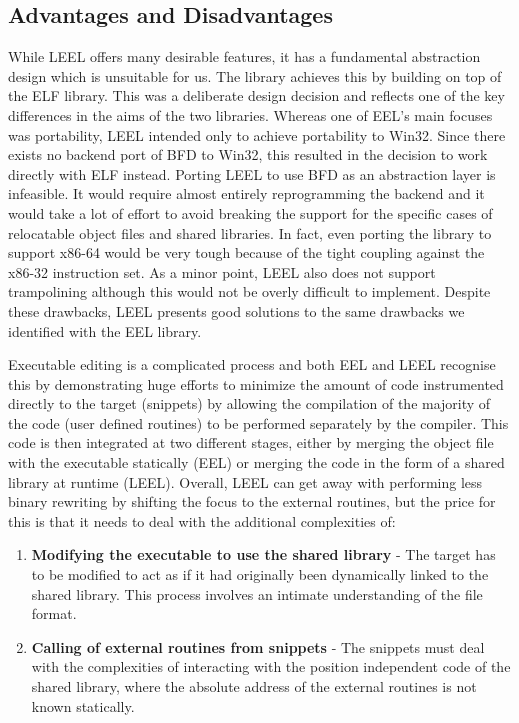 \subsection{Advantages and Disadvantages}

While LEEL offers many desirable features, it has a fundamental abstraction design which is unsuitable for us. The library achieves this by building on top of the ELF library. This was a deliberate design decision and reflects one of the key differences in the aims of the two libraries. Whereas one of EEL's main focuses was portability, LEEL intended only to achieve portability to Win32. Since there exists no backend port of BFD to Win32, this resulted in the decision to work directly with ELF instead. Porting LEEL to use BFD as an abstraction layer is infeasible. It would require almost entirely reprogramming the backend and it would take a lot of effort to avoid breaking the support for the specific cases of relocatable object files and shared libraries. In fact, even porting the library to support x86-64 would be very tough because of the tight coupling against the x86-32 instruction set. As a minor point, LEEL also does not support trampolining although this would not be overly difficult to implement. Despite these drawbacks, LEEL presents good solutions to the same drawbacks we identified with the EEL library.

Executable editing is a complicated process and both EEL and LEEL recognise this by demonstrating huge efforts to minimize the amount of code instrumented directly to the target (snippets) by allowing the compilation of the majority of the code (user defined routines) to be performed separately by the compiler. This code is then integrated at two different stages, either by merging the object file with the executable statically (EEL) or merging the code in the form of a shared library at runtime (LEEL). Overall, LEEL can get away with performing less binary rewriting by shifting the focus to the external routines, but the price for this is that it needs to deal with the additional complexities of:

\begin{enumerate}
 \item \textbf{Modifying the executable to use the shared library} - The target has to be modified to act as if it had originally been dynamically linked to the shared library. This process involves an intimate understanding of the file format.
 \item \textbf{Calling of external routines from snippets} - The snippets must deal with the complexities of interacting with the position independent code of the shared library, where the absolute address of the external routines is not known statically.
\end{enumerate}

